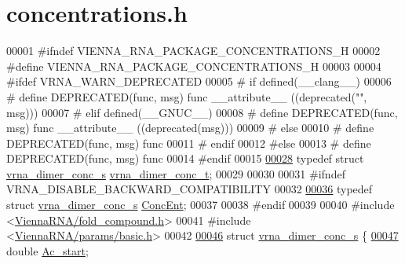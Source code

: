 \hypertarget{concentrations_8h_source}{}\section{concentrations.\+h}
\label{concentrations_8h_source}

\begin{DoxyCode}
00001 \textcolor{preprocessor}{#ifndef VIENNA\_RNA\_PACKAGE\_CONCENTRATIONS\_H}
00002 \textcolor{preprocessor}{#define VIENNA\_RNA\_PACKAGE\_CONCENTRATIONS\_H}
00003 
00004 \textcolor{preprocessor}{#ifdef VRNA\_WARN\_DEPRECATED}
00005 \textcolor{preprocessor}{# if defined(\_\_clang\_\_)}
00006 \textcolor{preprocessor}{#  define DEPRECATED(func, msg) func \_\_attribute\_\_ ((deprecated("", msg)))}
00007 \textcolor{preprocessor}{# elif defined(\_\_GNUC\_\_)}
00008 \textcolor{preprocessor}{#  define DEPRECATED(func, msg) func \_\_attribute\_\_ ((deprecated(msg)))}
00009 \textcolor{preprocessor}{# else}
00010 \textcolor{preprocessor}{#  define DEPRECATED(func, msg) func}
00011 \textcolor{preprocessor}{# endif}
00012 \textcolor{preprocessor}{#else}
00013 \textcolor{preprocessor}{# define DEPRECATED(func, msg) func}
00014 \textcolor{preprocessor}{#endif}
00015 
\hyperlink{group__pf__cofold_gac48c2723444ecfdceafcfd525ca98322}{00028} \textcolor{keyword}{typedef} \textcolor{keyword}{struct }\hyperlink{structvrna__dimer__conc__s}{vrna\_dimer\_conc\_s} \hyperlink{structvrna__dimer__conc__s}{vrna\_dimer\_conc\_t};
00029 
00030 
00031 \textcolor{preprocessor}{#ifndef VRNA\_DISABLE\_BACKWARD\_COMPATIBILITY}
00032 
\hyperlink{group__pf__cofold_ga46244c7adf5040580291c45b465f4efa}{00036} \textcolor{keyword}{typedef} \textcolor{keyword}{struct }\hyperlink{structvrna__dimer__conc__s}{vrna\_dimer\_conc\_s} \hyperlink{structvrna__dimer__conc__s}{ConcEnt};
00037 
00038 \textcolor{preprocessor}{#endif}
00039 
00040 \textcolor{preprocessor}{#include <\hyperlink{fold__compound_8h}{ViennaRNA/fold\_compound.h}>}
00041 \textcolor{preprocessor}{#include <\hyperlink{params_2basic_8h}{ViennaRNA/params/basic.h}>}
00042 
\hyperlink{structvrna__dimer__conc__s}{00046} \textcolor{keyword}{struct }\hyperlink{structvrna__dimer__conc__s}{vrna\_dimer\_conc\_s} \{
\hyperlink{structvrna__dimer__conc__s_a6e64ce1afbc93756afef06c0e3ccce97}{00047}   \textcolor{keywordtype}{double}  \hyperlink{structvrna__dimer__conc__s_a6e64ce1afbc93756afef06c0e3ccce97}{Ac\_start};   

\end{DoxyCode}
